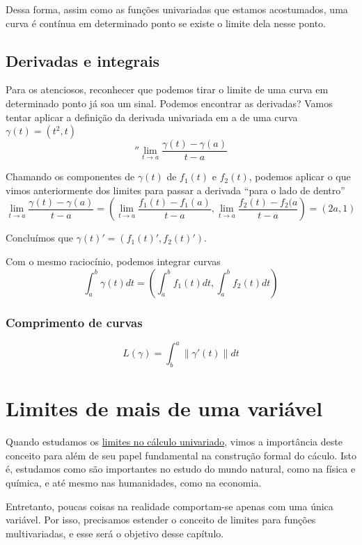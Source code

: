\documentclass[
  letterpaper,
  DIV=11,
  numbers=noendperiod]{scrreprt}
\begin{document}
Dessa forma, assim como as funções univariadas que estamos acostumados,
uma curva é contínua em determinado ponto se existe o limite dela nesse
ponto.

\section{Derivadas e integrais}\label{derivadas-e-integrais}

Para os atenciosos, reconhecer que podemos tirar o limite de uma curva
em determinado ponto já soa um sinal. Podemos encontrar as derivadas?
Vamos tentar aplicar a definição da derivada univariada em a de uma
curva \(\gamma(t) = (t^2, t)\) \[''
\lim_{t\rightarrow a} \frac{\gamma(t)-\gamma(a)}{t-a}
\]

Chamando os componentes de \(\gamma(t)\) de \(f_{1}(t)\) e \(f_{2}(t)\),
podemos aplicar o que vimos anteriormente dos limites para passar a
derivada ``para o lado de dentro'' \[
\lim_{t\rightarrow a} \frac{\gamma(t) - \gamma(a)}{t-a} = \left(\lim_{t \rightarrow a} \frac{f_{1}(t) - f_{1}(a)}{t-a},
\lim_{t \rightarrow a}\frac{f_{2}(t)-f_{2}(a}{t-a} \right) = (2a, 1)
\]

Concluímos que \(\gamma(t)' = (f_{1}(t)', f_{2}(t)')\).

Com o mesmo raciocínio, podemos integrar curvas \[
\int_{a}^{b} \gamma(t)dt = \left(\int_{a}^{b} f_{1}(t)dt, \int_{a}^{b}f_{2}(t)dt\right)
\]

\subsection{Comprimento de curvas}\label{comprimento-de-curvas}

\[
L(\gamma) = \int^{a}_{b} \lVert \gamma'(t) \rVert dt
\]

\chapter{Limites de mais de uma
variável}\label{limites-de-mais-de-uma-variuxe1vel}

Quando estudamos os \href{limites.qmd}{limites no cálculo univariado},
vimos a importância deste conceito para além de seu papel fundamental na
construção formal do cáculo. Isto é, estudamos como são importantes no
estudo do mundo natural, como na física e química, e até mesmo nas
humanidades, como na economia.

Entretanto, poucas coisas na realidade comportam-se apenas com uma única
variável. Por isso, precisamos estender o conceito de limites para
funções multivariadas, e esse será o objetivo desse capítulo.
\end{document}
